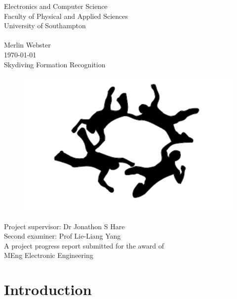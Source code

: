 \documentclass[a4paper, 12pt]{article}
\begin{document}
\begin{titlepage}
\begin{center}{\LARGE
Electronics and Computer Science\\
Faculty of Physical and Applied Sciences\\
University of Southampton\\
\hfill \break
\hfill \break
\hfill \break\\
Merlin Webster\\
\today\\
\hfill \break
Skydiving Formation Recognition\\
\begin{figure}[H]
	\centering
	\includegraphics[width=.7\linewidth]{fs_silhouette.png}
\end{figure}
Project supervisor: Dr Jonathon S Hare\\
Second examiner: Prof Lie-Liang Yang\\
\hfill \break
\hfill \break
A project progress report submitted for the award of\\
MEng Electronic Engineering\\}
\end{center}
\end{titlepage}
%
\thispagestyle{empty}
\setcounter{page}{0}
\tableofcontents

\clearpage
\section{Introduction}
%
\end{document}
